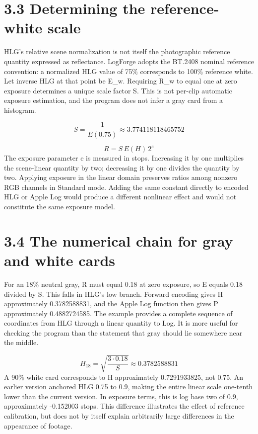 \documentclass[11pt,a4paper,openany]{book}
\begin{document}
\section*{3.3 Determining the reference-white scale}
HLG's relative scene normalization is not itself the photographic reference quantity expressed as reflectance. LogForge adopts the BT.2408 nominal reference convention: a normalized HLG value of 75\% corresponds to 100\% reference white. Let inverse HLG at that point be E\_w. Requiring R\_w to equal one at zero exposure determines a unique scale factor S. This is not per-clip automatic exposure estimation, and the program does not infer a gray card from a histogram.


\begin{equation}
S=\frac{1}{E(0.75)}\approx3.774118118465752
\end{equation}

\begin{equation}
R=S\,E(H)\,2^{e}
\end{equation}
The exposure parameter e is measured in stops. Increasing it by one multiplies the scene-linear quantity by two; decreasing it by one divides the quantity by two. Applying exposure in the linear domain preserves ratios among nonzero RGB channels in Standard mode. Adding the same constant directly to encoded HLG or Apple Log would produce a different nonlinear effect and would not constitute the same exposure model.


\section*{3.4 The numerical chain for gray and white cards}
For an 18\% neutral gray, R must equal 0.18 at zero exposure, so E equals 0.18 divided by S. This falls in HLG's low branch. Forward encoding gives H approximately 0.3782588831, and the Apple Log function then gives P approximately 0.4882724585. The example provides a complete sequence of coordinates from HLG through a linear quantity to Log. It is more useful for checking the program than the statement that gray should lie somewhere near the middle.


\begin{equation}
H_{18}=\sqrt{\frac{3\cdot0.18}{S}}\approx0.3782588831
\end{equation}
A 90\% white card corresponds to H approximately 0.7291933825, not 0.75. An earlier version anchored HLG 0.75 to 0.9, making the entire linear scale one-tenth lower than the current version. In exposure terms, this is log base two of 0.9, approximately -0.152003 stops. This difference illustrates the effect of reference calibration, but does not by itself explain arbitrarily large differences in the appearance of footage.
\end{document}

